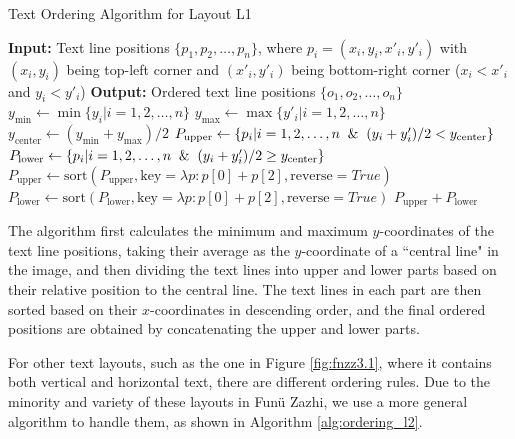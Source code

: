 \documentclass[12pt,twoside]{report}
\begin{document}
\begin{algorithm}[htbp]
    \caption{Text Ordering Algorithm for Layout L1}
    \begin{algorithmic}[1]
        \State \textbf{Input:} Text line positions $\{p_1, p_2, \ldots, p_n\}$, where $p_i = (x_i, y_i, x'_i, y'_i)$ with $(x_i, y_i)$ being top-left corner and $(x'_i, y'_i)$ being bottom-right corner ($x_i < x'_i$ and $y_i < y'_i$)
        \State \textbf{Output:} Ordered text line positions $\{o_1, o_2, \ldots, o_n\}$
            \State $y_{\text{min}} \gets \min \{y_i | i = 1, 2, \ldots, n\}$
            \State $y_{\text{max}} \gets \max \{y'_i | i = 1, 2, \ldots, n\}$
            \State $y_{\text{center}} \gets (y_{\text{min}}+y_{\text{max}})/2$
            \State $P_{\text{upper}} \gets \{p_i | i = 1, 2, \ldots, n \And (y_i+y'_i)/2 < y_{\text{center}}\}$
            \State $P_{\text{lower}} \gets \{p_i | i = 1, 2, \ldots, n \And (y_i+y'_i)/2 \geq y_{\text{center}}\}$
            \State $P_{\text{upper}} \gets \text{sort}(P_{\text{upper}}, \text{key}=\lambda p: p[0] + p[2], \text{reverse}=True)$
            \State $P_{\text{lower}} \gets \text{sort}(P_{\text{lower}}, \text{key}=\lambda p: p[0] + p[2], \text{reverse}=True)$
            \State \Return $P_{\text{upper}} + P_{\text{lower}}$
        \EndFunction
    \end{algorithmic}
    \label{alg:ordering_l1}
\end{algorithm}

The algorithm first calculates the minimum and maximum $y$-coordinates of the text line positions, taking their average as the $y$-coordinate of a ``central line" in the image, and then dividing the text lines into upper and lower parts based on their relative position to the central line. The text lines in each part are then sorted based on their $x$-coordinates in descending order, and the final ordered positions are obtained by concatenating the upper and lower parts.

For other text layouts, such as the one in Figure \ref{fig:fnzz3.1}, where it contains both vertical and horizontal text, there are different ordering rules. Due to the minority and variety of these layouts in Funü Zazhi, we use a more general algorithm to handle them, as shown in Algorithm \ref{alg:ordering_l2}.
\end{document}
